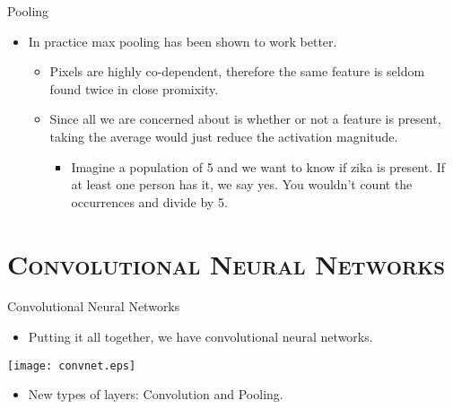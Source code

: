 \begin{frame}{Pooling}
	\begin{itemize}
		\item In practice max pooling has been shown to work better.
		      \begin{itemize}
		      	\item Pixels are highly co-dependent, therefore the same feature is seldom found twice in close promixity.
		      	\item Since all we are concerned about is whether or not a feature is present, taking the average would just reduce the activation magnitude.
		      	      \begin{itemize}
		      	      	\item Imagine a population of 5 and we want to know if zika is present. If at least one person has it, we say yes. You wouldn't count the occurrences and divide by 5.
		      	      \end{itemize}
		      \end{itemize}
	\end{itemize}
\end{frame}

\section{\scshape Convolutional Neural Networks}
\begin{frame}{Convolutional Neural Networks}
	\begin{itemize}
		\item Putting it all together, we have convolutional neural networks.
	\end{itemize}
	\begin{center}
		\texttt{[image: convnet.eps]}
	\end{center}
	\begin{itemize}
		\item New types of layers: Convolution and Pooling.
	\end{itemize}
\end{frame}

